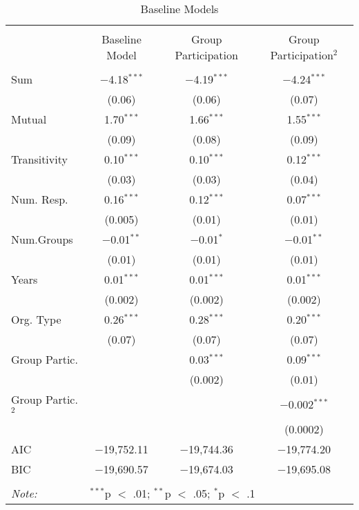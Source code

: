 
\begin{table}[!htbp] \centering 
  \caption{Baseline Models} 
  \label{table:basemods} 
\begin{tabular}{@{\extracolsep{5pt}}lccc} 
\\[-1.8ex]\hline \\[-1.8ex] 
 & Baseline Model & Group Participation & Group Participation$^2$ \\ 
\hline \\[-1.8ex] 
 Sum & $-$4.18$^{***}$ & $-$4.19$^{***}$ & $-$4.24$^{***}$ \\ 
  & (0.06) & (0.06) & (0.07) \\ 
  Mutual & 1.70$^{***}$ & 1.66$^{***}$ & 1.55$^{***}$ \\ 
  & (0.09) & (0.08) & (0.09) \\ 
  Transitivity & 0.10$^{***}$ & 0.10$^{***}$ & 0.12$^{***}$ \\ 
  & (0.03) & (0.03) & (0.04) \\ 
  Num. Resp. & 0.16$^{***}$ & 0.12$^{***}$ & 0.07$^{***}$ \\ 
  & (0.005) & (0.01) & (0.01) \\ 
  Num.Groups & $-$0.01$^{**}$ & $-$0.01$^{*}$ & $-$0.01$^{**}$ \\ 
  & (0.01) & (0.01) & (0.01) \\ 
  Years & 0.01$^{***}$ & 0.01$^{***}$ & 0.01$^{***}$ \\ 
  & (0.002) & (0.002) & (0.002) \\ 
  Org. Type & 0.26$^{***}$ & 0.28$^{***}$ & 0.20$^{***}$ \\ 
  & (0.07) & (0.07) & (0.07) \\ 
  Group Partic. &  & 0.03$^{***}$ & 0.09$^{***}$ \\ 
  &  & (0.002) & (0.01) \\ 
  Group Partic.$^2$ &  &  & $-$0.002$^{***}$ \\ 
  &  &  & (0.0002) \\ 
 AIC & $-$19,752.11 & $-$19,744.36 & $-$19,774.20 \\ 
BIC & $-$19,690.57 & $-$19,674.03 & $-$19,695.08 \\ 
\hline \\[-1.8ex] 
\textit{Note:} & \multicolumn{3}{l}{$^{***}$p $<$ .01; $^{**}$p $<$ .05; $^{*}$p $<$ .1} \\ 
\end{tabular} 
\end{table} 
